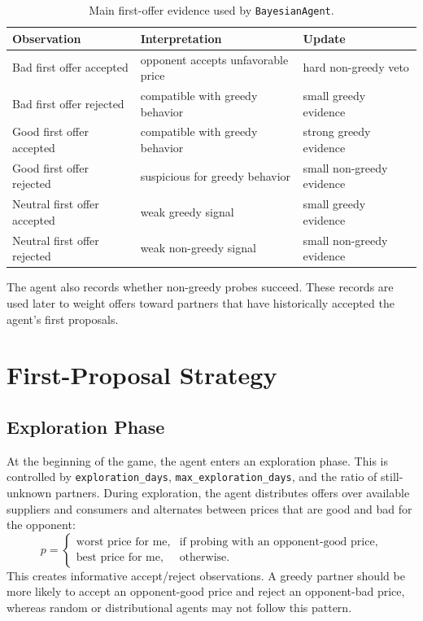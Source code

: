 \documentclass[11pt]{article}
\begin{document}
\begin{table}[h]
\centering
\begin{tabular}{lll}
\toprule
Observation & Interpretation & Update \\
\midrule
Bad first offer accepted & opponent accepts unfavorable price & hard non-greedy veto \\
Bad first offer rejected & compatible with greedy behavior & small greedy evidence \\
Good first offer accepted & compatible with greedy behavior & strong greedy evidence \\
Good first offer rejected & suspicious for greedy behavior & small non-greedy evidence \\
Neutral first offer accepted & weak greedy signal & small greedy evidence \\
Neutral first offer rejected & weak non-greedy signal & small non-greedy evidence \\
\bottomrule
\end{tabular}
\caption{Main first-offer evidence used by \texttt{BayesianAgent}.}
\label{tab:evidence}
\end{table}

The agent also records whether non-greedy probes succeed.  These records are
used later to weight offers toward partners that have historically accepted
the agent's first proposals.

\section{First-Proposal Strategy}

\subsection{Exploration Phase}

At the beginning of the game, the agent enters an exploration phase.  This is
controlled by \texttt{exploration\_days}, \texttt{max\_exploration\_days}, and
the ratio of still-unknown partners.  During exploration, the agent distributes
offers over available suppliers and consumers and alternates between prices
that are good and bad for the opponent:
\[
  p =
  \begin{cases}
    \text{worst price for me}, & \text{if probing with an opponent-good price},\\
    \text{best price for me},  & \text{otherwise}.
  \end{cases}
\]
This creates informative accept/reject observations.  A greedy partner should
be more likely to accept an opponent-good price and reject an opponent-bad
price, whereas random or distributional agents may not follow this pattern.
\end{document}
